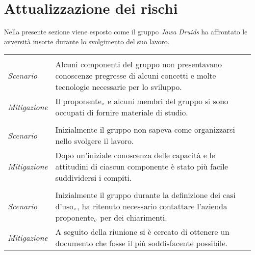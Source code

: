 \chapter{Attualizzazione dei rischi}\label{AttualizzazioneDeiRischi}
Nella presente sezione viene esposto come il gruppo \textit{Jawa Druids} ha affrontato le avversità insorte durante lo svolgimento del suo lavoro.

\def\tabularxcolumn#1{m{#1}}
{
	
	\begin{center}
		\renewcommand{\arraystretch}{1.4}
		\begin{longtable}{|p{5cm}|p{12cm}|}
			\hline
			\rowcolor{airforceblue}
			\multicolumn{2}{|c|}{\textbf{Periodo di Analisi}}\\
			\hline
			\rowcolor{airforceblue}
			\multicolumn{2}{|c|}{\textit{RT1- Inesperienza tecnologica}}\\
			\hline
			\textit{Scenario} & Alcuni componenti del gruppo non presentavano conoscenze pregresse di alcuni concetti e molte tecnologie necessarie per lo sviluppo. \\
			\hline
			\textit{Mitigazione} & Il proponente$_{\scaleto{G}{3pt}}$ e alcuni membri del gruppo si sono occupati di fornire materiale di studio. \\
			\hline
			\rowcolor{airforceblue}
			\multicolumn{2}{|c|}{\textit{RO4- Inesperienza nel coordinamento}}\\
			\hline
			\textit{Scenario} & Inizialmente il gruppo non sapeva come organizzarsi nello svolgere il lavoro. \\
			\hline
			\textit{Mitigazione} & Dopo un'iniziale conoscenza delle capacità e le attitudini di ciascun componente è stato più facile suddividersi i compiti. \\
			\hline
			\rowcolor{airforceblue}
			\multicolumn{2}{|c|}{\textit{RO7- Analisi dei requisiti imperfetta}}\\
			\hline
			\textit{Scenario} & Inizialmente il gruppo durante la definizione dei casi d'uso$_{\scaleto{G}{3pt}}$, ha ritenuto necessario contattare l'azienda proponente$_{\scaleto{G}{3pt}}$ per dei chiarimenti. \\
			\hline
			\textit{Mitigazione} & A seguito della riunione si è cercato di ottenere un documento che fosse il più soddisfacente possibile. \\
		\end{longtable}
	\end{center}


}
